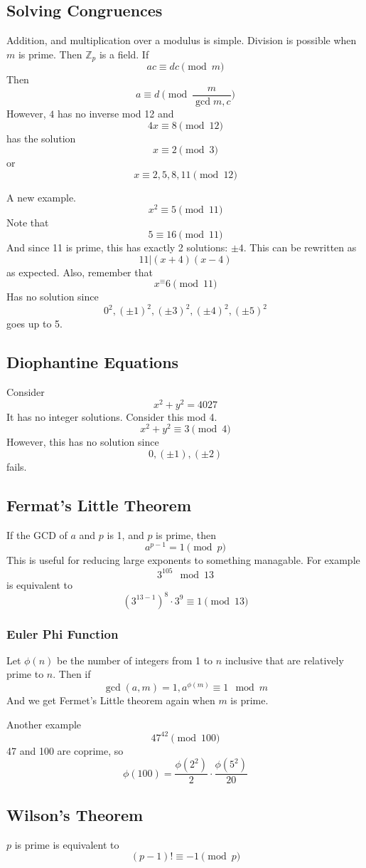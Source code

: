 \documentclass{article}
\begin{document}
\subsection{Solving Congruences}
Addition, and multiplication over a modulus is simple. Division is possible when 
$m$ is prime. Then $\mathbb{Z}_p$ is a field. If 
\[ ac \equiv dc \pmod{m} \]
Then 
\[ a \equiv d \pmod{\frac{m}{\gcd{m,c}}} \]
However, $4$ has no inverse mod 12 and
\[ 4x \equiv 8 \pmod{12} \]
has the solution
\[ x \equiv 2 \pmod 3 \]
or 
\[ x \equiv 2, 5, 8, 11 \pmod{12} \]

A new example. 
\[ x^2 \equiv 5 \pmod{11} \]
Note that 
\[ 5 \equiv 16 \pmod{11} \]
And since 11 is prime, this has exactly 2 solutions: $\pm 4$. This can be
rewritten as 
\[ 11 | (x+4)(x-4) \] as expected.
Also, remember that
\[ x^\equiv 6 \pmod{11} \] 
Has no solution since
\[ 0^2, (\pm1)^2, (\pm 3)^2, (\pm 4)^2, (\pm 5)^2 \]
goes up to 5. 

\subsection{Diophantine Equations}
Consider
\[ x^2 + y^2 = 4027 \]
It has no integer solutions. Consider this mod 4. 
\[ x^2 + y^2 \equiv 3 \pmod 4 \]
However, this has no solution since 
\[ 0, (\pm 1), (\pm 2) \]
fails.  

\subsection{Fermat's Little Theorem}

If the GCD of $a$ and $p$ is 1, and $p$ is prime, then 
\[ a^{p-1} = 1 \pmod{p} \]
This is useful for reducing large exponents to something managable. For example
\[ 3^{105} \mod 13 \]
is equivalent to
\[ \left(3^{13-1}\right)^{8} \cdot 3^9 \equiv 1 \pmod{13} \]

\subsubsection{Euler Phi Function}
Let $\phi(n)$ be the number of integers from 1 to $n$ inclusive that are
relatively prime to $n$. Then if 
\[ \gcd(a,m) = 1, a^{\phi(m)} \equiv 1 \mod m \]
And we get Fermet's Little theorem again when $m$ is prime. 

Another example
\[ 47^42 \pmod{100} \]
47 and 100 are coprime, so
\[ \phi(100) = \frac{\phi(2^2)}{2}\cdot\frac{\phi(5^2)}{20} \]

\subsection{Wilson's Theorem}
$p$ is prime is equivalent to
\[ (p-1)! \equiv -1 \pmod{p} \]
\end{document}
